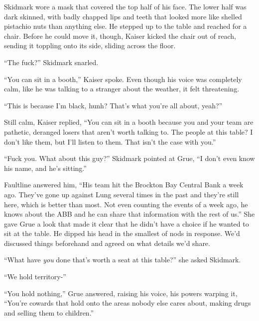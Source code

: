 Skidmark wore a mask that covered the top half of his face.  The lower half was dark skinned, with badly chapped lips and teeth that looked more like shelled pistachio nuts than anything else.  He stepped up to the table and reached for a chair.  Before he could move it, though, Kaiser kicked the chair out of reach, sending it toppling onto its side, sliding across the floor.



``The fuck?'' Skidmark snarled.



``You can sit in a booth,'' Kaiser spoke.  Even though his voice was completely calm, like he was talking to a stranger about the weather, it felt threatening.



``This is because I'm black, hunh?  That's what you're all about, yeah?''



Still calm, Kaiser replied, ``You can sit in a booth because you and your team are pathetic, deranged losers that aren't worth talking to.  The people at this table?  I don't like them, but I'll listen to them.  That isn't the case with you.''



``Fuck you.  What about this guy?'' Skidmark pointed at Grue, ``I don't even know his name, and he's sitting.''



Faultline answered him, ``His team hit the Brockton Bay Central Bank a week ago.  They've gone up against Lung several times in the past and they're still here, which is better than most.  Not even counting the events of a week ago, he knows about the ABB and he can share that information with the rest of us.''  She gave Grue a look that made it clear that he didn't have a choice if he wanted to sit at the table.  He dipped his head in the smallest of nods in response.  We'd discussed things beforehand and agreed on what details we'd share.



``What have \emph{you} done that's worth a seat at this table?'' she asked Skidmark.



``We hold territory-''



``You hold nothing,'' Grue answered, raising his voice, his powers warping it, ``You're cowards that hold onto the areas nobody else cares about, making drugs and selling them to children.''



